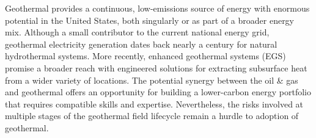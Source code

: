 Geothermal provides a continuous, low-emissions source of energy with enormous potential in the United States, both singularly or as part of a broader energy mix. Although a small contributor to the current national energy grid, geothermal electricity generation dates back nearly a century for natural hydrothermal systems. More recently, enhanced geothermal systems (EGS) promise a broader reach with engineered solutions for extracting subsurface heat from a wider variety of locations. The potential synergy between the oil \& gas and geothermal offers an opportunity for building a lower-carbon energy portfolio that requires compatible skills and expertise. Nevertheless, the risks involved at multiple stages of the geothermal field lifecycle remain a hurdle to adoption of geothermal.


